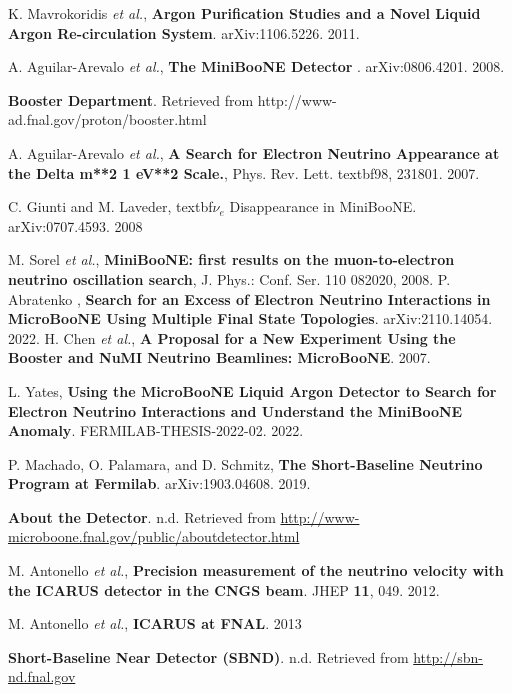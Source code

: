  K. Mavrokoridis \textit{et al.}, \textbf{Argon Purification Studies and a Novel Liquid Argon Re-circulation System}. arXiv:1106.5226. 2011.	

 A. Aguilar-Arevalo \textit{et al.}, \textbf{The MiniBooNE Detector
}. arXiv:0806.4201. 2008.

 \textbf{Booster Department}. Retrieved from http://www-ad.fnal.gov/proton/booster.html

 A. Aguilar-Arevalo \textit{et al.}, \textbf{A Search for Electron Neutrino Appearance at the Delta m**2 1 eV**2 Scale.}, Phys. Rev. Lett. textbf{98}, 231801. 2007. 

 C. Giunti and M. Laveder, textbf{$\nu_e$ Disappearance in MiniBooNE}. arXiv:0707.4593. 2008

 M. Sorel \textit{et al.}, \textbf{MiniBooNE: first results on the muon-to-electron neutrino oscillation search}, J. Phys.: Conf. Ser. 110 082020, 2008.
 P. Abratenko , \textbf{Search for an Excess of Electron Neutrino Interactions in MicroBooNE Using Multiple Final State Topologies}. arXiv:2110.14054. 2022.
 H. Chen \textit{et al.}, \textbf{A Proposal for a New Experiment Using the Booster and NuMI Neutrino Beamlines: MicroBooNE}. 2007.

 L. Yates, \textbf{Using the MicroBooNE Liquid Argon Detector
to Search for Electron Neutrino Interactions and Understand the MiniBooNE Anomaly}. FERMILAB-THESIS-2022-02. 2022.

 P. Machado, O. Palamara, and D. Schmitz, \textbf{The Short-Baseline Neutrino Program at Fermilab}. arXiv:1903.04608. 2019. 

 \textbf{About the Detector}. n.d. Retrieved from \href{http://www-microboone.fnal.gov/public/aboutdetector.html}{http://www-microboone.fnal.gov/public/aboutdetector.html}

 M. Antonello \textit{et al.}, \textbf{Precision measurement of the neutrino velocity with the ICARUS detector in the CNGS beam}. JHEP \textbf{11}, 049. 2012.

 M. Antonello \textit{et al.}, \textbf{ICARUS at FNAL}. 2013

 \textbf{Short-Baseline Near Detector (SBND)}. n.d. Retrieved from \href{http://sbn-nd.fnal.gov}{http://sbn-nd.fnal.gov}


